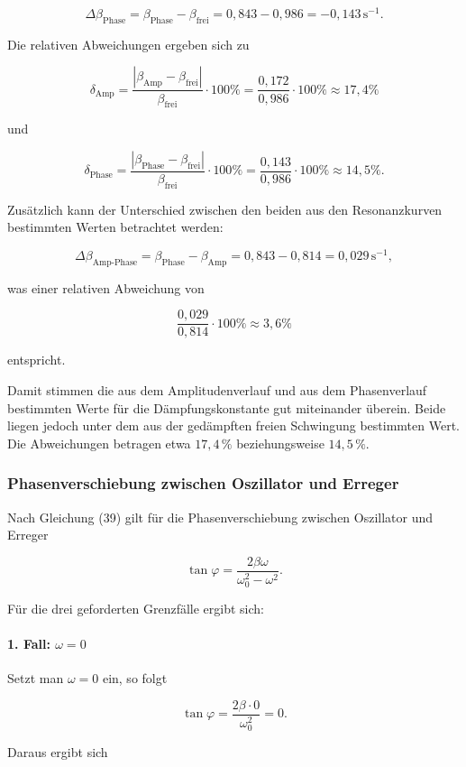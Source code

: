 \documentclass{report}
\begin{document}
\[
\Delta \beta_{\text{Phase}}
=
\beta_{\text{Phase}}-\beta_{\text{frei}}
=
0{,}843-0{,}986
=
-0{,}143\,\mathrm{s^{-1}}.
\]

Die relativen Abweichungen ergeben sich zu

\[
\delta_{\text{Amp}}
=
\frac{|\beta_{\text{Amp}}-\beta_{\text{frei}}|}{\beta_{\text{frei}}}\cdot 100\%
=
\frac{0{,}172}{0{,}986}\cdot 100\%
\approx 17{,}4\%
\]

und

\[
\delta_{\text{Phase}}
=
\frac{|\beta_{\text{Phase}}-\beta_{\text{frei}}|}{\beta_{\text{frei}}}\cdot 100\%
=
\frac{0{,}143}{0{,}986}\cdot 100\%
\approx 14{,}5\%.
\]

Zusätzlich kann der Unterschied zwischen den beiden aus den Resonanzkurven bestimmten Werten betrachtet werden:

\[
\Delta \beta_{\text{Amp-Phase}}
=
\beta_{\text{Phase}}-\beta_{\text{Amp}}
=
0{,}843-0{,}814
=
0{,}029\,\mathrm{s^{-1}},
\]

was einer relativen Abweichung von

\[
\frac{0{,}029}{0{,}814}\cdot 100\%
\approx 3{,}6\%
\]

entspricht.

Damit stimmen die aus dem Amplitudenverlauf und aus dem Phasenverlauf
bestimmten Werte für die Dämpfungskonstante gut miteinander überein. 
Beide liegen jedoch unter dem aus der gedämpften freien Schwingung bestimmten Wert. 
Die Abweichungen betragen etwa $17{,}4\,\%$ beziehungsweise $14{,}5\,\%$.

\subsubsection*{Phasenverschiebung zwischen Oszillator und Erreger}

Nach Gleichung (39) gilt für die Phasenverschiebung zwischen Oszillator und Erreger

\[
\tan\varphi=\frac{2\beta\omega}{\omega_0^2-\omega^2}.
\]

Für die drei geforderten Grenzfälle ergibt sich:

\paragraph{1. Fall: $\omega = 0$}
Setzt man $\omega=0$ ein, so folgt

\[
\tan\varphi=\frac{2\beta\cdot 0}{\omega_0^2}=0.
\]

Daraus ergibt sich
\end{document}
